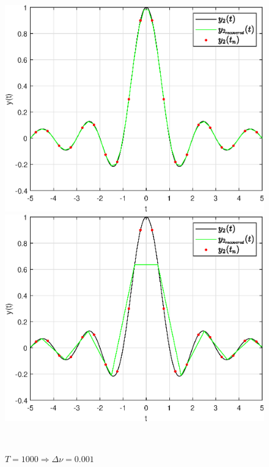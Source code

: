 \documentclass[a4paper]{article}
\begin{document}
\begin{figure}[H]
    \begin{minipage}{0.5\textwidth}
        \centering \includegraphics[width=\textwidth]{graphs2/T_200_dt_0.5_B_1_dv_0.005/func2_recovered.eps}
        \caption{$T = 200 \Rightarrow \Delta \nu = 0.005$}
    \end{minipage}\hfill
    \begin{minipage}{0.5\textwidth}
        \centering \includegraphics[width=\textwidth]{graphs2/T_1000_dt_0.5_B_1_dv_0.001/func2_recovered.eps}
        \caption{$T = 1000 \Rightarrow \Delta \nu = 0.001$}
    \end{minipage}\\[1em]
\end{figure}\noindent\
\end{document}
